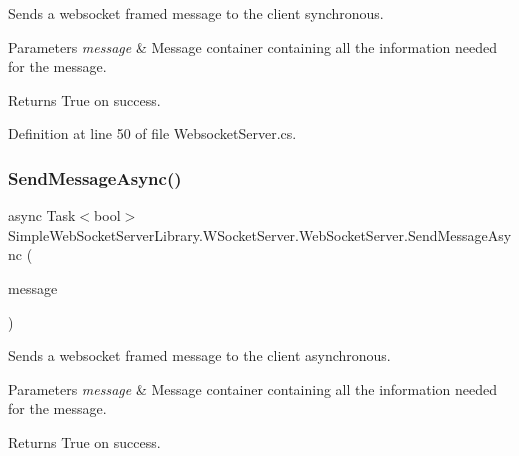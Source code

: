 Sends a websocket framed message to the client synchronous. 


\begin{DoxyParams}{Parameters}
{\em message} & Message container containing all the information needed for the message.\\
\hline
\end{DoxyParams}
\begin{DoxyReturn}{Returns}
True on success.
\end{DoxyReturn}


Definition at line 50 of file Websocket\+Server.\+cs.

\mbox{\label{class_simple_web_socket_server_library_1_1_w_socket_server_1_1_web_socket_server_aee6acd7a909b4f9376cb3896484a24b5}} 
\subsubsection{\texorpdfstring{Send\+Message\+Async()}{SendMessageAsync()}}
{\footnotesize\ttfamily async Task$<$bool$>$ Simple\+Web\+Socket\+Server\+Library.\+W\+Socket\+Server.\+Web\+Socket\+Server.\+Send\+Message\+Async (\begin{DoxyParamCaption}\item[{\mbox{\hyperlink{class_simple_web_socket_server_library_1_1_web_socket_message_container}{Web\+Socket\+Message\+Container}}}]{message }\end{DoxyParamCaption})}



Sends a websocket framed message to the client asynchronous. 


\begin{DoxyParams}{Parameters}
{\em message} & Message container containing all the information needed for the message.\\
\hline
\end{DoxyParams}
\begin{DoxyReturn}{Returns}
True on success.
\end{DoxyReturn}


